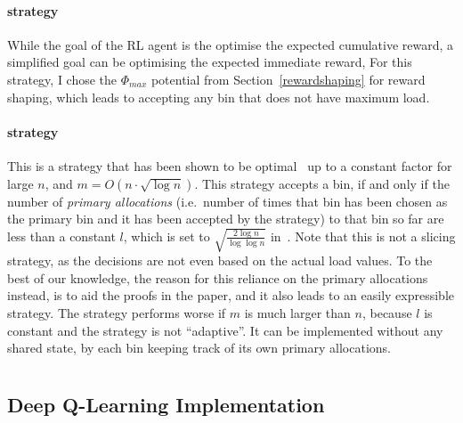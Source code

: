 \paragraph{\LocalRewardOptimiser strategy}

While the goal of the RL agent is the optimise the expected cumulative reward, a simplified goal can be optimising the expected immediate reward, For this strategy, I chose the $\Phi_{max}$ potential from Section~\ref{rewardshaping} for reward shaping, which leads to accepting any bin that does not have maximum load.


\paragraph{\Threshold strategy \protect\footnotemark[1]} 



This is a strategy that has been shown to be optimal~\cite{feldheim2021thinning} up to a constant factor for large $n$, and $m = O(n \cdot \sqrt{\log n})$. This strategy accepts a bin, if and only if the number of \textit{primary allocations} (i.e.\ number of times that bin has been chosen as the primary bin and it has been accepted by the strategy) to that bin so far are less than a constant $l$, which is set to $\sqrt{\frac{2\log n}{\log \log n}}$ in~\cite{feldheim2021thinning}. Note that this is not a slicing strategy, as the decisions are not even based on the actual load values. To the best of our knowledge, the reason for this reliance on the primary allocations instead, is to aid the proofs in the paper, and it also leads to an easily expressible strategy. The strategy performs worse if $m$ is much larger than $n$, because $l$ is constant and the strategy is not ``adaptive''. It can be implemented without any shared state, by each bin keeping track of its own primary allocations.

\section{\KThinning}


\subsection{Deep Q-Learning Implementation}


